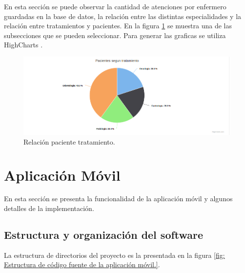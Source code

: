 En esta sección se puede observar la cantidad de atenciones por enfermero guardadas en la base de datos, la relación entre las distintas especialidades y la relación entre tratamientos y pacientes. En la figura \ref{fig:Relación paciente tratamiento.} se muestra una de las subsecciones que se pueden seleccionar. Para generar las graficas se utiliza HighCharts \citep{WEBSITE:33}. 
\begin{figure}[ht]
	\centering
	\includegraphics[scale=.40]{./Figures/web/pacientes-Tratamiento.png}
	\caption{Relación paciente tratamiento.}
	\label{fig:Relación paciente tratamiento.}
\end{figure} 


\pagebreak
\section{Aplicación Móvil}
\label{Aplicación Móvil}
En esta sección se presenta la funcionalidad de la aplicación móvil y algunos detalles de la implementación.
\label{Estructura y organización del software}
\subsection{Estructura y organización del software}
La estructura de directorios del proyecto es la presentada en la figura \ref{fig: Estructura de código fuente de la aplicación móvil.}.

